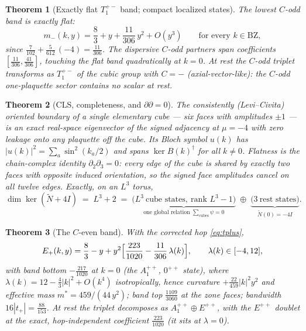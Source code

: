 \documentclass[11pt]{article}
\newtheorem{theorem}{Theorem}[section]
\newcommand{\Nt}{\widetilde N}
\begin{document}
\begin{theorem}[Exactly flat $T_1^{+-}$ band; compact localized states]
\label{thm:flatband}
The lowest $C$-odd band is exactly flat:
\begin{equation}
m_-(k,y)=\frac83+y+\frac{11}{306}\,y^2+O(y^3)
\qquad\text{for every }k\in\mathrm{BZ},
\end{equation}
since $\tfrac{7}{102}+\tfrac{5}{612}\,(-4)=\tfrac{11}{306}$. The dispersive
$C$-odd partners span coefficients $[\tfrac{11}{306},\tfrac{41}{306}]$,
touching the flat band quadratically at $k=0$. At rest the $C$-odd triplet
transforms as $T_1^{+-}$ of the cubic group with $C=-$ (axial-vector-like):
\emph{the $C$-odd one-plaquette sector contains no scalar at rest}.
\end{theorem}

\begin{theorem}[CLS, completeness, and $\partial\partial=0$]\label{thm:cls}
The consistently (Levi--Civita) oriented boundary of a single elementary
cube --- six faces with amplitudes $\pm1$ --- is an exact real-space
eigenvector of the signed adjacency at $\mu=-4$ with zero leakage onto any
plaquette off the cube. Its Bloch symbol $u(k)$ has
$|u(k)|^2=\sum_a\sin^2(k_a/2)$ and spans $\ker B(k)^\dagger$ for all
$k\neq0$. Flatness is the chain-complex identity
$\partial_2\partial_3=0$: every edge of the cube is shared by exactly two
faces with opposite induced orientation, so the signed face amplitudes cancel
on all twelve edges. Exactly, on an $L^3$ torus,
\begin{equation}
\dim\ker(\Nt+4I)\;=\;L^3+2\;=\;
\underbrace{\bigl(L^3\ \text{cube states},\ \text{rank }L^3-1\bigr)}_{
\text{one global relation }\sum_{\mathrm{cubes}}\psi=0}
\;\oplus\;
\underbrace{\bigl(3\ \text{rest states}\bigr)}_{\Nt(0)=-4I}.
\end{equation}
\end{theorem}

\begin{theorem}[The $C$-even band]\label{thm:ceven}
With the corrected hop \eqref{eq:tplus},
\begin{equation}
E_+(k,y)=\frac83-y+y^2\Bigl[\frac{223}{1020}-\frac{11}{306}\,\lambda(k)\Bigr],
\qquad \lambda(k)\in[-4,12],
\end{equation}
with band bottom $-\tfrac{217}{1020}$ at $k=0$ (the $A_1^{++}$, $0^{++}$
state), where $\lambda(k)=12-\tfrac43|k|^2+O(k^4)$ isotropically, hence
curvature $+\tfrac{22}{459}|k|^2y^2$ and effective mass $m^*=459/(44\,y^2)$;
band top $\tfrac{1109}{3060}$ at the zone faces; bandwidth
$16|t_+|=\tfrac{88}{153}$. At rest the triplet decomposes as
$A_1^{++}\oplus E^{++}$, with the $E^{++}$ doublet at the exact,
hop-independent coefficient $\tfrac{223}{1020}$ (it sits at $\lambda=0$).
\end{theorem}
\end{document}
